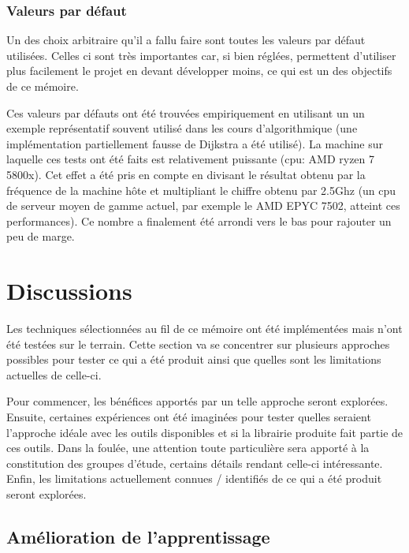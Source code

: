 \documentclass[a4paper]{report}
\begin{document}
\subsection{Valeurs par défaut}
Un des choix arbitraire qu'il a fallu faire sont toutes les valeurs par défaut utilisées.
Celles ci sont très importantes car, si bien réglées, permettent d'utiliser plus facilement le projet en devant développer moins, ce qui est un des objectifs de ce mémoire.

Ces valeurs par défauts ont été trouvées empiriquement en utilisant un un exemple représentatif souvent utilisé dans les cours d'algorithmique (une implémentation partiellement fausse de Dijkstra a été utilisé).
La machine sur laquelle ces tests ont été faits est relativement puissante (cpu: AMD ryzen 7 5800x).
Cet effet a été pris en compte en divisant le résultat obtenu par la fréquence de la machine hôte et multipliant le chiffre obtenu par 2.5Ghz (un cpu de serveur moyen de gamme actuel, par exemple le AMD EPYC 7502, atteint ces performances).
Ce nombre a finalement été arrondi vers le bas pour rajouter un peu de marge.

\chapter{Discussions}

Les techniques sélectionnées au fil de ce mémoire ont été implémentées mais n'ont été testées sur le terrain.
Cette section va se concentrer sur plusieurs approches possibles pour tester ce qui a été produit ainsi que quelles sont les limitations actuelles de celle-ci.

Pour commencer, les bénéfices apportés par un telle approche seront explorées.
Ensuite, certaines expériences ont été imaginées pour tester quelles seraient l'approche idéale avec les outils disponibles et si la librairie produite fait partie de ces outils.
Dans la foulée, une attention toute particulière sera apporté à la constitution des groupes d'étude, certains détails rendant celle-ci intéressante.
Enfin, les limitations actuellement connues / identifiés de ce qui a été produit seront explorées.

\section{Amélioration de l'apprentissage}
\end{document}

